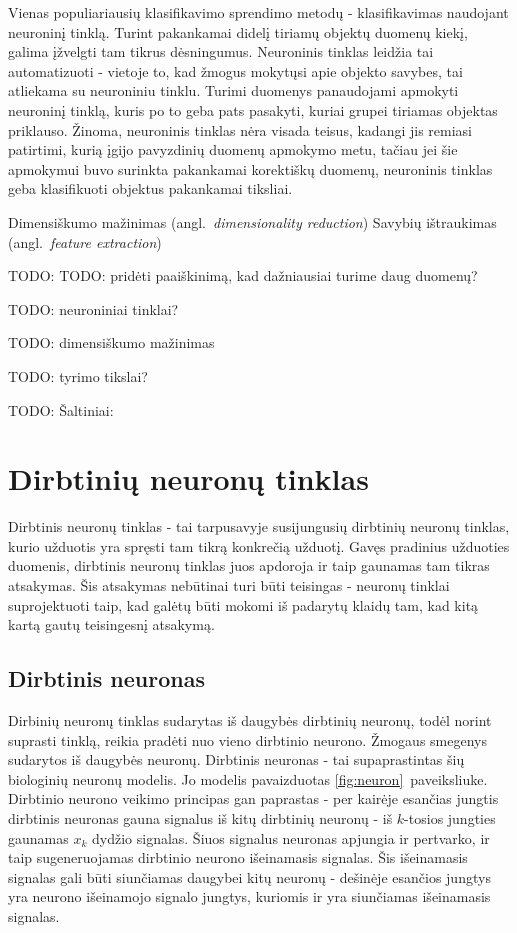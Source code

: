 \documentclass{VUMIFPSbakalaurinis}
\newcommand{\TODO}[1]{
\colorbox{todo-background-color}{TODO: #1}
}
\begin{document}
Vienas populiariausių klasifikavimo sprendimo metodų - klasifikavimas naudojant neuroninį tinklą.
Turint pakankamai didelį tiriamų objektų duomenų kiekį, galima įžvelgti tam tikrus dėsningumus.
Neuroninis tinklas leidžia tai automatizuoti - vietoje to, kad žmogus mokytųsi apie objekto savybes, tai atliekama su neuroniniu tinklu.
Turimi duomenys panaudojami apmokyti neuroninį tinklą, kuris po to geba pats pasakyti, kuriai grupei tiriamas objektas priklauso.
Žinoma, neuroninis tinklas nėra visada teisus, kadangi jis remiasi patirtimi, kurią įgijo pavyzdinių duomenų apmokymo metu, tačiau jei šie apmokymui buvo surinkta pakankamai korektiškų duomenų, neuroninis tinklas geba klasifikuoti objektus pakankamai tiksliai.

Dimensiškumo mažinimas (angl.~\textit{dimensionality reduction})
Savybių ištraukimas (angl.~\textit{feature extraction})

\TODO{TODO: pridėti paaiškinimą, kad dažniausiai turime daug duomenų?}

\TODO{neuroniniai tinklai?}
\TODO{dimensiškumo mažinimas}
\TODO{tyrimo tikslai?}


\TODO{Šaltiniai:}

\cite{298007} \cite{363467} \cite[289~psl.]{price-dimensionality-reduction}

\section{Dirbtinių neuronų tinklas}

Dirbtinis neuronų tinklas - tai tarpusavyje susijungusių dirbtinių neuronų tinklas, kurio užduotis yra spręsti tam tikrą konkrečią užduotį.
Gavęs pradinius užduoties duomenis, dirbtinis neuronų tinklas juos apdoroja ir taip gaunamas tam tikras atsakymas.
Šis atsakymas nebūtinai turi būti teisingas - neuronų tinklai suprojektuoti taip, kad galėtų būti mokomi iš padarytų klaidų tam, kad kitą kartą gautų teisingesnį atsakymą.

\subsection{Dirbtinis neuronas}

Dirbinių neuronų tinklas sudarytas iš daugybės dirbtinių neuronų, todėl norint suprasti tinklą, reikia pradėti nuo vieno dirbtinio neurono.
Žmogaus smegenys sudarytos iš daugybės neuronų.
Dirbtinis neuronas - tai supaprastintas šių biologinių neuronų modelis.
Jo modelis pavaizduotas \ref{fig:neuron}~paveiksliuke.
Dirbtinio neurono veikimo principas gan paprastas - per kairėje esančias jungtis dirbtinis neuronas gauna signalus iš kitų dirbtinių neuronų - iš $k$-tosios jungties gaunamas $x_k$ dydžio signalas.
Šiuos signalus neuronas apjungia ir pertvarko, ir taip sugeneruojamas dirbtinio neurono išeinamasis signalas.
Šis išeinamasis signalas gali būti siunčiamas daugybei kitų neuronų - dešinėje esančios jungtys yra neurono išeinamojo signalo jungtys, kuriomis ir yra siunčiamas išeinamasis signalas.
\end{document}
